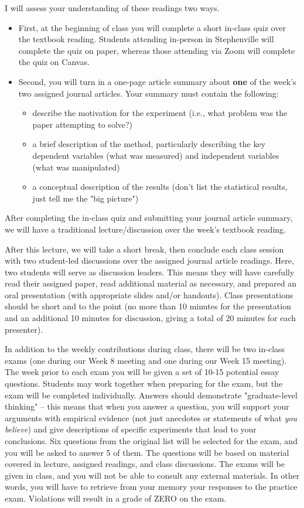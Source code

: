 \documentclass[10pt]{article}
\begin{document}
I will assess your understanding of these readings two ways.
\begin{itemize}
\item First, at the beginning of class you will complete a short in-class quiz over the textbook reading. Students attending in-person in Stephenville will complete the quiz on paper, whereas those attending via Zoom will complete the quiz on Canvas.
\item Second, you will turn in a one-page article summary about \textbf{one} of the week's two assigned journal articles.  Your summary must contain the following:
\begin{itemize}
\item describe the motivation for the experiment (i.e., what problem was the paper attempting to solve?)
\item a brief description of the method, particularly describing the key dependent variables (what was measured) and independent variables (what was manipulated)
\item a conceptual description of the results (don't list the statistical results, just tell me the "big picture")
\end{itemize}
\end{itemize}

After completing the in-class quiz and submitting your journal article summary, we will have a traditional lecture/discussion over the week's textbook reading.

After this lecture, we will take a short break, then conclude each class session with two student-led discussions over the assigned journal article readings. Here, two students will serve as discussion leaders.  This means they will have carefully read their assigned paper, read additional material as necessary, and prepared an oral presentation (with appropriate slides and/or handouts).  Class presentations should be short and to the point (no more than 10 minutes for the presentation and an additional 10 minutes for discussion, giving a total of 20 minutes for each presenter).

In addition to the weekly contributions during class, there will be two in-class exams (one during our Week 8 meeting and one during our Week 15 meeting).  The week prior to each exam you will be given a set of 10-15 potential essay questions. Students may work together when preparing for the exam, but the exam will be completed individually. Answers should demonstrate "graduate-level thinking" -- this means that when you answer a question, you will support your arguments with empirical evidence (not just anecdotes or statements of what \emph{you believe}) and give descriptions of specific experiments that lead to your conclusions. Six questions from the original list will be selected for the exam, and you will be asked to answer 5 of them. The questions will be based on material covered in lecture, assigned readings, and class discussions. The exams will be given in class, and you will not be able to consult any external materials.  In other words, you will have to retrieve from your memory your responses to the practice exam.  Violations will result in a grade of ZERO on the exam.
\end{document}
